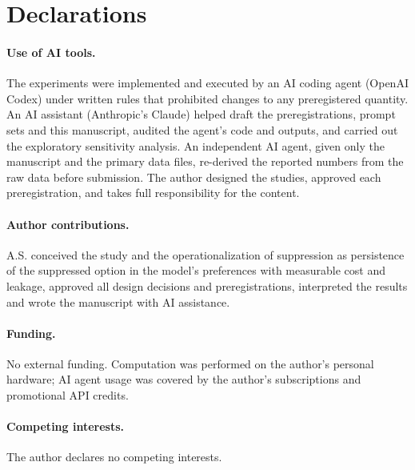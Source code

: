 \documentclass[11pt]{article}
\begin{document}
\section*{Declarations}

\paragraph{Use of AI tools.} The experiments were implemented and executed by an AI coding agent (OpenAI Codex) under written rules that prohibited changes to any preregistered quantity. An AI assistant (Anthropic's Claude) helped draft the preregistrations, prompt sets and this manuscript, audited the agent's code and outputs, and carried out the exploratory sensitivity analysis. An independent AI agent, given only the manuscript and the primary data files, re-derived the reported numbers from the raw data before submission. The author designed the studies, approved each preregistration, and takes full responsibility for the content.

\paragraph{Author contributions.} A.S. conceived the study and the operationalization of suppression as persistence of the suppressed option in the model's preferences with measurable cost and leakage, approved all design decisions and preregistrations, interpreted the results and wrote the manuscript with AI assistance.

\paragraph{Funding.} No external funding. Computation was performed on the author's personal hardware; AI agent usage was covered by the author's subscriptions and promotional API credits.

\paragraph{Competing interests.} The author declares no competing interests.



\end{document}
